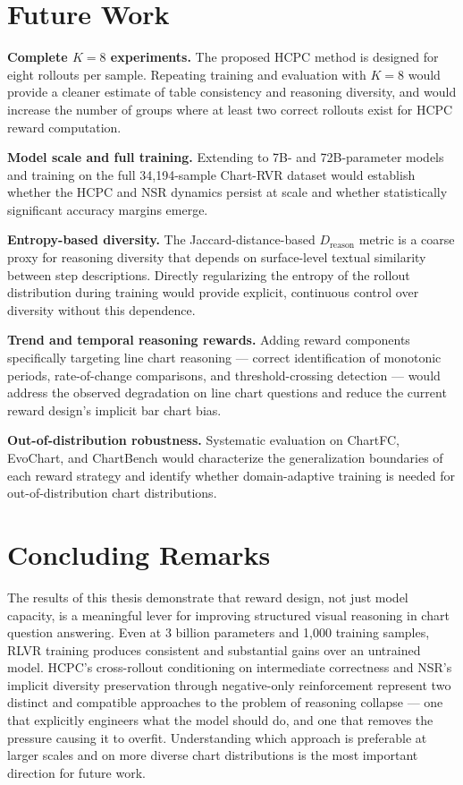\documentclass{iutbscthesis}
\begin{document}
\section{Future Work}

\textbf{Complete $K=8$ experiments.} The proposed HCPC method is designed for eight rollouts per sample. Repeating training and evaluation with $K=8$ would provide a cleaner estimate of table consistency and reasoning diversity, and would increase the number of groups where at least two correct rollouts exist for HCPC reward computation.

\textbf{Model scale and full training.} Extending to 7B- and 72B-parameter models and training on the full 34,194-sample Chart-RVR dataset would establish whether the HCPC and NSR dynamics persist at scale and whether statistically significant accuracy margins emerge.

\textbf{Entropy-based diversity.} The Jaccard-distance-based $D_{\text{reason}}$ metric is a coarse proxy for reasoning diversity that depends on surface-level textual similarity between step descriptions. Directly regularizing the entropy of the rollout distribution during training would provide explicit, continuous control over diversity without this dependence.

\textbf{Trend and temporal reasoning rewards.} Adding reward components specifically targeting line chart reasoning --- correct identification of monotonic periods, rate-of-change comparisons, and threshold-crossing detection --- would address the observed degradation on line chart questions and reduce the current reward design's implicit bar chart bias.

\textbf{Out-of-distribution robustness.} Systematic evaluation on ChartFC, EvoChart, and ChartBench would characterize the generalization boundaries of each reward strategy and identify whether domain-adaptive training is needed for out-of-distribution chart distributions.

\section{Concluding Remarks}

The results of this thesis demonstrate that reward design, not just model capacity, is a meaningful lever for improving structured visual reasoning in chart question answering. Even at 3 billion parameters and 1,000 training samples, RLVR training produces consistent and substantial gains over an untrained model. HCPC's cross-rollout conditioning on intermediate correctness and NSR's implicit diversity preservation through negative-only reinforcement represent two distinct and compatible approaches to the problem of reasoning collapse --- one that explicitly engineers what the model should do, and one that removes the pressure causing it to overfit. Understanding which approach is preferable at larger scales and on more diverse chart distributions is the most important direction for future work.


\printbib
\end{document}
